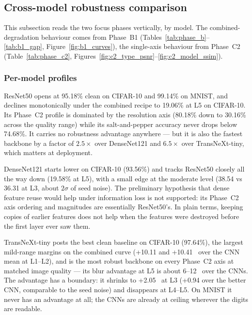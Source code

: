 \subsection{Cross-model robustness comparison}
\label{sec:crossmodel}

This subsection reads the two focus phases vertically, by model. The
combined-degradation behaviour comes from Phase~B1
(Tables~\ref{tab:phase_b}--\ref{tab:b1_gap}, Figure~\ref{fig:b1_curves}), the
single-axis behaviour from Phase~C2 (Table~\ref{tab:phase_c2},
Figures~\ref{fig:c2_type_psnr}--\ref{fig:c2_model_ssim}).

\subsubsection{Per-model profiles}
\label{sec:cm:profiles}

 ResNet50 opens at
95.18\% clean on CIFAR-10 and 99.14\% on MNIST, and declines monotonically
under the combined recipe to 19.06\% at L5 on CIFAR-10. Its Phase~C2 profile
is dominated by the resolution axis (80.18\% down to 30.16\% across the
quality range) while its salt-and-pepper accuracy never drops below 74.68\%.
It carries no robustness advantage anywhere --- but it is also the fastest
backbone by a factor of $2.5\times$ over DenseNet121 and $6.5\times$ over
TransNeXt-tiny, which matters at deployment.

 DenseNet121
starts lower on CIFAR-10 (93.56\%) and tracks ResNet50 closely all the way
down (19.58\% at L5), with a small edge at the moderate level (38.54 vs
36.31 at L3, about $2\sigma$ of seed noise). The preliminary hypothesis that
dense feature reuse would help under information loss is not supported: its
Phase~C2 axis ordering and magnitudes are essentially ResNet50's. In plain
terms, keeping copies of earlier features does not help when the features
were destroyed before the first layer ever saw them.

TransNeXt-tiny posts the best clean baseline on CIFAR-10 (97.64\%), the
largest mild-range margins on the combined curve (+10.11 and +10.41~\Mpp{}
over the CNN mean at L1--L2), and is the most robust backbone on every
Phase~C2 axis at matched image quality --- its blur advantage at L5 is
about 6--12~\Mpp{} over the CNNs. The advantage has a boundary: it shrinks
to +2.05~\Mpp{} at L3 (+0.94 over the better CNN, comparable to the seed
noise) and disappears at L4--L5. On MNIST it never has an advantage at all;
the CNNs are already at ceiling wherever the digits are readable.

